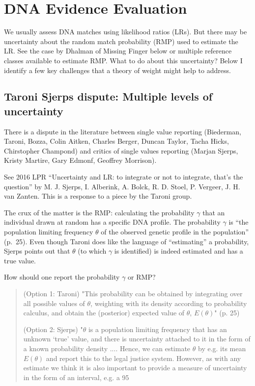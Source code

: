 \documentclass[
  10pt,
  dvipsnames,enabledeprecatedfontcommands]{scrartcl}
\begin{document}
\hypertarget{dna-evidence-evaluation}{%
\section{DNA Evidence Evaluation}\label{dna-evidence-evaluation}}

We usually assess DNA matches using likelihood ratios (LRs). But there
may be uncertainty about the random match probability (RMP) used to
estimate the LR. See the case by Dhalman of Missing Finger below or
multiple reference classes available to estimate RMP. What to do about
this uncertainty? Below I identify a few key challenges that a theory of
weight might help to address.

\hypertarget{taroni-sjerps-dispute-multiple-levels-of-uncertainty}{%
\subsection{Taroni Sjerps dispute: Multiple levels of
uncertainty}\label{taroni-sjerps-dispute-multiple-levels-of-uncertainty}}

There is a dispute in the literature between single value reporting
(Biederman, Taroni, Bozza, Colin Aitken, Charles Berger, Duncan Taylor,
Tacha Hicks, Chirstopher Champond) and critics of single values
reporting (Marjan Sjerps, Kristy Martire, Gary Edmonf, Geoffrey
Morrison).

See 2016 LPR ``Uncertainty and LR: to integrate or not to integrate,
that's the question'' by M. J. Sjerps, I. Alberink, A. Bolck, R. D.
Stoel, P. Vergeer, J. H. van Zanten. This is a response to a piece by
the Taroni group.

The crux of the matter is the RMP: calculating the probability
\(\gamma\) that an individual drawn at random has a specific DNA
profile. The probability \(\gamma\) is ``the population limiting
frequency \(\theta\) of the observed genetic profile in the population''
(p.~25). Even though Taroni does like the language of ``estimating'' a
probability, Sjerps points out that \(\theta\) (to which \(\gamma\) is
identified) is indeed estimated and has a true value.

How should one report the probability \(\gamma\) or RMP?

\begin{quote}
(Option 1: Taroni) "This probability can be obtained by integrating over all
possible values of $\theta$, weighting with its density according to probability calculus, and obtain the
(posterior) expected value of $\theta$, $E(\theta)$" (p. 25)

(Option 2: Sjerps) "$\theta$ is a population limiting frequency that has an
unknown ‘true’ value, and there is uncertainty attached to it in the form of a known probability
density .... Hence, we can estimate $\theta$ by e.g. its mean $E(\theta)$ and report this to the legal
justice system. However, as with any estimate we think it is also important to provide a measure of
uncertainty in the form of an interval, e.g. a 95%
\end{quote}
\end{document}
